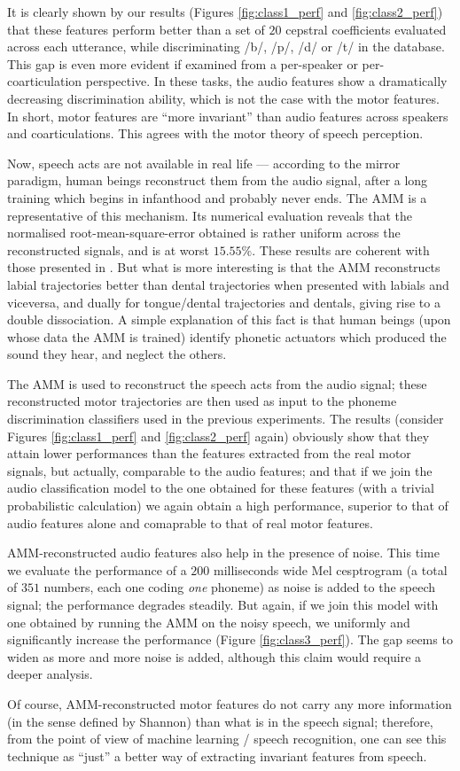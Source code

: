 It is clearly shown by our results (Figures \ref{fig:class1_perf}
and \ref{fig:class2_perf}) that these features perform
better than a set of $20$ cepstral coefficients evaluated across each utterance,
while discriminating /b/, /p/, /d/ or /t/ in the database. This gap is even
more evident if examined from a per-speaker or per-coarticulation perspective.
In these tasks, the audio features show a dramatically decreasing discrimination
ability, which is not the case with the motor features. In short, motor features
are ``more invariant'' than audio features across speakers and coarticulations.
This agrees with the motor theory of speech perception.

Now, speech acts are not available in real life --- according to the mirror
paradigm, human beings reconstruct them from the audio signal, after a long
training which begins in infanthood and probably never ends. The AMM is a
representative of this mechanism. Its numerical evaluation
reveals that the normalised root-mean-square-error obtained is rather
uniform across the reconstructed signals, and is at worst $15.55\%$. These
results are coherent with those presented in \cite{papcun,richmond2002,richmond2007}.
But what is more interesting is that the AMM reconstructs labial trajectories
better than dental trajectories when presented with labials and viceversa,
and dually for tongue/dental trajectories and dentals, giving rise to a double
dissociation. A simple explanation of this fact is that human beings
(upon whose data the AMM is trained) identify phonetic actuators which produced
the sound they hear, and neglect the others.

The AMM is used to reconstruct the speech acts from the audio signal; these
reconstructed motor trajectories are then used as input to the phoneme
discrimination classifiers used in the previous experiments. The results
(consider Figures \ref{fig:class1_perf} and \ref{fig:class2_perf} again)
obviously show that they attain lower performances than the features
extracted from the real motor signals, but actually, comparable
to the audio features; and that if we join the audio classification model
to the one obtained for these features (with a trivial probabilistic calculation)
we again obtain a high performance, superior to that of audio features alone
and comaprable to that of real motor features.

AMM-reconstructed audio features also help in the presence of noise. This time
we evaluate the performance of a $200$ milliseconds wide Mel cesptrogram (a total
of $351$ numbers, each one coding \emph{one} phoneme) as noise is added to the
speech signal; the performance degrades steadily. But again, if we join this
model with one obtained by running the AMM on the noisy speech, we uniformly
and significantly increase the performance (Figure \ref{fig:class3_perf}). The
gap seems to widen as more and more noise is added, although this claim would
require a deeper analysis.

Of course, AMM-reconstructed motor features do not carry any more information
(in the sense defined by Shannon) than what is in the speech signal; therefore,
from the point of view of machine learning / speech recognition, one can see
this technique as ``just'' a better way of extracting invariant features from
speech.
